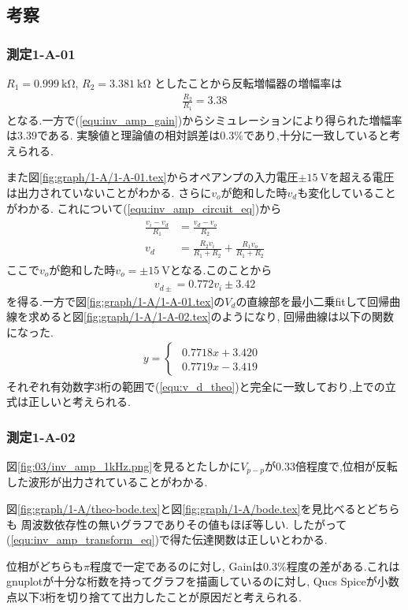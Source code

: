 \subsection{考察}
\subsubsection{測定1-A-01}
$R_1=0.999\ \si{\kilo\ohm}$, $R_2=3.381\ \si{\kilo\ohm}$
としたことから反転増幅器の増幅率は
\begin{align}
  \frac{R_2}{R_1}=3.38
\end{align}
となる.一方で(\ref{equ:inv_amp_gain})からシミュレーションにより得られた増幅率は$3.39$である.
実験値と理論値の相対誤差は$0.3\%$であり,十分に一致していると考えられる.

また図\ref{fig:graph/1-A/1-A-01.tex}からオペアンプの入力電圧$\pm15\ \si{\volt}$を超える電圧は出力されていないことがわかる.
さらに$v_o$が飽和した時$v_d$も変化していることがわかる.
これについて(\ref{equ:inv_amp_circuit_eq})から
\begin{align}
  \begin{split}
    \frac{v_i-v_d}{R_1}&=\frac{v_d-v_o}{R_2}\\
    v_d&=\frac{R_2v_i}{R_1+R_2}+\frac{R_1v_o}{R_1+R_2}
  \end{split}
\end{align}
ここで$v_o$が飽和した時$v_o=\pm15\ \si{\volt}$となる.このことから
\begin{align}
  \label{equ:v_d_theo}
  v_{d\pm}=0.772v_i\pm3.42
\end{align}
を得る.一方で図\ref{fig:graph/1-A/1-A-01.tex}の$V_d$の直線部を最小二乗fitして回帰曲線を求めると図\ref{fig:graph/1-A/1-A-02.tex}のようになり,
回帰曲線は以下の関数になった.
\begin{align}
  y=
  \begin{cases}
    \begin{split}
      0.7718x+3.420\\
      0.7719x-3.419
    \end{split}
  \end{cases}
\end{align}
それぞれ有効数字3桁の範囲で(\ref{equ:v_d_theo})と完全に一致しており,上での立式は正しいと考えられる.
\subsubsection{測定1-A-02}
図\ref{fig:03/inv_amp_1kHz.png}を見るとたしかに$V_{p-p}$が0.33倍程度で,位相が反転した波形が出力されていることがわかる.

図\ref{fig:graph/1-A/theo-bode.tex}と図\ref{fig:graph/1-A/bode.tex}を見比べるとどちらも
周波数依存性の無いグラフでありその値もほぼ等しい.
したがって(\ref{equ:inv_amp_transform_eq})で得た伝達関数は正しいとわかる.

位相がどちらも$\pi$程度で一定であるのに対し,
Gainは$0.3\%$程度の差がある.これはgnuplotが十分な桁数を持ってグラフを描画しているのに対し,
Qucs Spiceが小数点以下3桁を切り捨てて出力したことが原因だと考えられる.